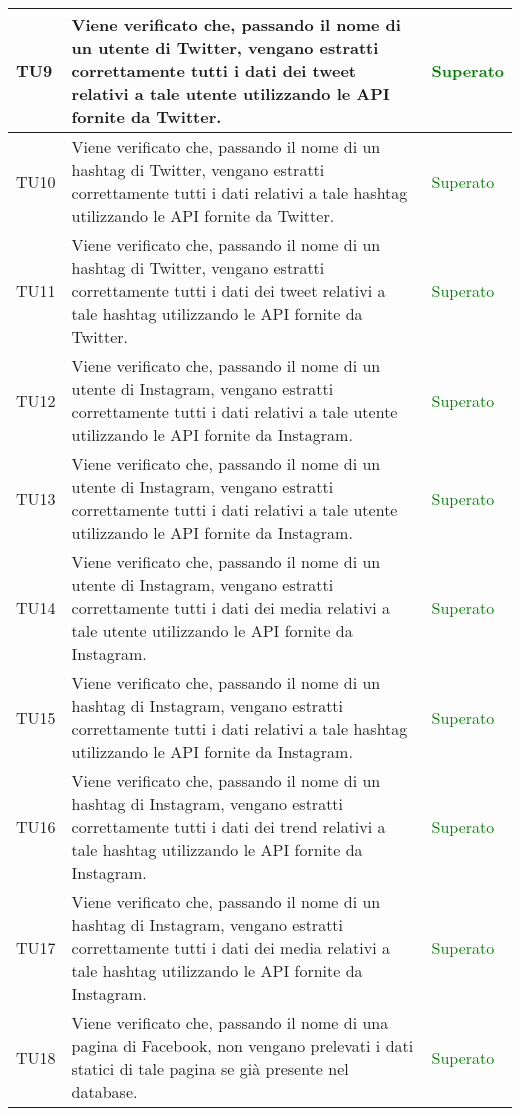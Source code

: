 \begin{center}
\begin{longtable}{| p{2cm} | p{8cm} | p{2.5cm} |}
					\hline
					TU9 & Viene verificato che, passando il nome di un utente di Twitter, vengano estratti correttamente tutti i dati dei tweet relativi a tale utente utilizzando le API fornite da Twitter. & \textcolor{green}{Superato}\\
					\hline
					TU10 & Viene verificato che, passando il nome di un hashtag di Twitter, vengano estratti correttamente tutti i dati relativi a tale hashtag utilizzando le API fornite da Twitter. & \textcolor{green}{Superato}\\
					\hline
					TU11 & Viene verificato che, passando il nome di un hashtag di Twitter, vengano estratti correttamente tutti i dati dei tweet relativi a tale hashtag utilizzando le API fornite da Twitter. & \textcolor{green}{Superato}\\
					\hline
					TU12 & Viene verificato che, passando il nome di un utente di Instagram, vengano estratti correttamente tutti i dati relativi a tale utente utilizzando le API fornite da Instagram. & \textcolor{green}{Superato}\\
					\hline
					TU13 & Viene verificato che, passando il nome di un utente di Instagram, vengano estratti correttamente tutti i dati relativi a tale utente utilizzando le API fornite da Instagram. & \textcolor{green}{Superato}\\
					\hline
					TU14 & Viene verificato che, passando il nome di un utente di Instagram, vengano estratti correttamente tutti i dati dei media relativi a tale utente utilizzando le API fornite da Instagram. & \textcolor{green}{Superato}\\
					\hline
					TU15 & Viene verificato che, passando il nome di un hashtag di Instagram, vengano estratti correttamente tutti i dati relativi a tale hashtag utilizzando le API fornite da Instagram. & \textcolor{green}{Superato}\\
					\hline
					TU16 & Viene verificato che, passando il nome di un hashtag di Instagram, vengano estratti correttamente tutti i dati dei trend relativi a tale hashtag utilizzando le API fornite da Instagram. & \textcolor{green}{Superato}\\
					\hline
					TU17 & Viene verificato che, passando il nome di un hashtag di Instagram, vengano estratti correttamente tutti i dati dei media relativi a tale hashtag utilizzando le API fornite da Instagram. & \textcolor{green}{Superato}\\
					\hline
					TU18 & Viene verificato che, passando il nome di una pagina di Facebook, non vengano prelevati i dati statici di tale pagina se già presente nel database. & \textcolor{green}{Superato}\\

\end{longtable}
\end{center}
